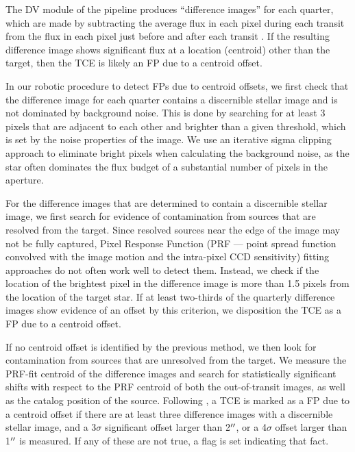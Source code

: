 The DV module of the \kepler{} pipeline produces ``difference images'' for each quarter, which are made by subtracting the average flux in each pixel during each transit from the flux in each pixel just before and after each transit \citep{Bryson2013}. If the resulting difference image shows significant flux at a location (centroid) other than the target, then the TCE is likely an FP due to a centroid offset.

In our robotic procedure to detect FPs due to centroid offsets, we first check that the difference image for each quarter contains a discernible stellar image and is not dominated by background noise. This is done by searching for at least 3 pixels that are adjacent to each other and brighter than a given threshold, which is set by the noise properties of the image. We use an iterative sigma clipping approach to eliminate bright pixels when calculating the background noise, as the star often dominates the flux budget of a substantial number of pixels in the aperture.

For the difference images that are determined to contain a discernible stellar image, we first search for evidence of contamination from sources that are resolved from the target. Since resolved sources near the edge of the image may not be fully captured, Pixel Response Function (PRF --- \keplers{} point spread function convolved with the image motion and the intra-pixel CCD sensitivity) fitting approaches do not often work well to detect them. Instead, we check if the location of the brightest pixel in the difference image is more than 1.5 pixels from the location of the target star. If at least two-thirds of the quarterly difference images show evidence of an offset by this criterion, we disposition the TCE as a FP due to a centroid offset. %

If no centroid offset is identified by the previous method, we then look for contamination from sources that are unresolved from the target. We measure the PRF-fit centroid of the difference images and search for statistically significant shifts with respect to the PRF centroid of both the out-of-transit images, as well as the catalog position of the source. Following \citet{Bryson2013}, a TCE is marked as a FP due to a centroid offset if there are at least three difference images with a discernible stellar image, and a 3$\sigma$ significant offset larger than 2$\mbox{$^{\prime\prime}$}$, or a 4$\sigma$ offset larger than 1$\mbox{$^{\prime\prime}$}$ is measured.  If any of these are not true, a flag is set indicating that fact.

